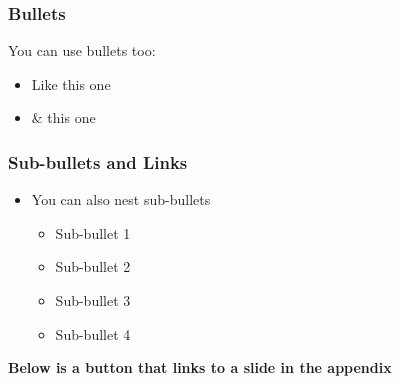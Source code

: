\begin{frame}
    \frametitle{Bullets}
    You can use bullets too: \newline
    \begin{itemize}
        \item Like this one \newline
        \item \& this one
    \end{itemize}
\end{frame}

\begin{frame}
    \label{Test} %
    \frametitle{Sub-bullets and Links}

    \begin{itemize}
        \item You can also nest sub-bullets
              \begin{itemize}
                  \item Sub-bullet 1
                  \item Sub-bullet 2
                  \item Sub-bullet 3
                  \item Sub-bullet 4 \newline
              \end{itemize}
    \end{itemize}

    \textbf{Below is a button that links to a slide in the appendix}

    \begin{center}
        \hyperlink{Figure}{}
    \end{center}
\end{frame}

